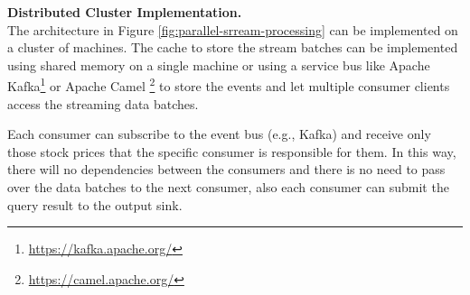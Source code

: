





\textbf{Distributed Cluster Implementation.}\\
The architecture in Figure \ref{fig:parallel-srream-processing} can be implemented on a cluster of machines. The cache to store the stream batches can be implemented using shared memory on a single machine or using a service bus like Apache Kafka\footnote{\url{https://kafka.apache.org/}} or Apache Camel \footnote{\url{https://camel.apache.org/}} to store
the events and let multiple consumer clients access the streaming data batches.

Each consumer can subscribe to the event bus (e.g., Kafka) and receive only those stock prices that the specific consumer is responsible
for them. In this way, there will no dependencies between the consumers and there is no need to pass over the data batches to the next
consumer, also each consumer can submit the query result to the output sink.

